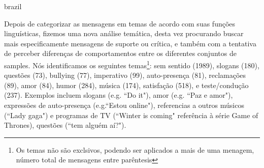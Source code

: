 \begin{otherlanguage*}{brazil}

Depois de categorizar as mensagens em temas de acordo com suas funções linguísticas, fizemos uma nova análise temática, desta vez procurando buscar mais especificamente mensagens de suporte ou crítica, e também com a tentativa de perceber diferenças de comportamentos entre os diferentes conjuntos de samples. Nós identificamos os seguintes temas\footnote{Os temas não são exclsivos, podendo ser aplicados a mais de uma menagem, número total de mensagens entre parêntesis}: sem sentido (1989), slogans (180), questões (73), bullying (77), imperativo (99), auto-presença (81), reclamações (89), amor (84), humor (284), música (174), satisfação (518), e teste/condução (237). Exemplos incluem slogans (e.g. ``Do it"), amor (e.g. ``Paz e amor"), expressões de auto-presença (e.g.``Estou online"), referencias a outros músicos (``Lady gaga") e programas de TV (``Winter is coming" referência à série Game of Thrones), questões (``tem alguém aí?"). 



\end{otherlanguage*}
